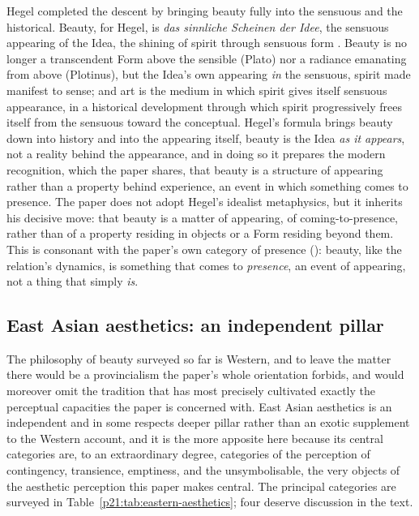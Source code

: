 Hegel completed the descent by bringing beauty fully into the sensuous and the historical. Beauty, for Hegel, is \emph{das sinnliche Scheinen der Idee}, the sensuous appearing of the Idea, the shining of spirit through sensuous form \parencite{hegel1975}. Beauty is no longer a transcendent Form above the sensible (Plato) nor a radiance emanating from above (Plotinus), but the Idea's own appearing \emph{in} the sensuous, spirit made manifest to sense; and art is the medium in which spirit gives itself sensuous appearance, in a historical development through which spirit progressively frees itself from the sensuous toward the conceptual. Hegel's formula brings beauty down into history and into the appearing itself, beauty is the Idea \emph{as it appears}, not a reality behind the appearance, and in doing so it prepares the modern recognition, which the paper shares, that beauty is a structure of appearing rather than a property behind experience, an event in which something comes to presence. The paper does not adopt Hegel's idealist metaphysics, but it inherits his decisive move: that beauty is a matter of appearing, of coming-to-presence, rather than of a property residing in objects or a Form residing beyond them. This is consonant with the paper's own category of presence (): beauty, like the relation's dynamics, is something that comes to \emph{presence}, an event of appearing, not a thing that simply \emph{is}.

\subsection{East Asian aesthetics: an independent pillar}
\label{p21:sub:ap-eastern-aesthetics}

The philosophy of beauty surveyed so far is Western, and to leave the matter there would be a provincialism the paper's whole orientation forbids, and would moreover omit the tradition that has most precisely cultivated exactly the perceptual capacities the paper is concerned with. East Asian aesthetics is an independent and in some respects deeper pillar rather than an exotic supplement to the Western account, and it is the more apposite here because its central categories are, to an extraordinary degree, categories of the perception of contingency, transience, emptiness, and the unsymbolisable, the very objects of the aesthetic perception this paper makes central. The principal categories are surveyed in Table~\ref{p21:tab:eastern-aesthetics}; four deserve discussion in the text.

